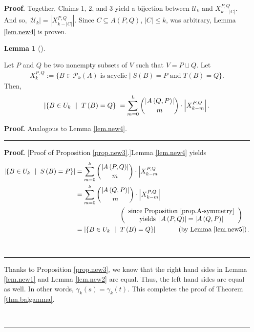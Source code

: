 \documentclass[numbers=enddot,12pt,final,onecolumn,notitlepage]{scrartcl}%
\theoremstyle{definition}
\newtheorem{lem}[theo]{Lemma}
\newenvironment{lemma}[1][]
{\begin{lem}[#1]\begin{leftbar}}
{\end{leftbar}\end{lem}}
\newenvironment{proof}[1][Proof]{\noindent\textbf{#1.} }{\ \rule{0.5em}{0.5em}}
\let\sumnonlimits\sum
\renewcommand{\sum}{\sumnonlimits\limits}
\theoremstyle{plainsl}
\begin{document}
\begin{proof}
\bigskip
Together, Claims 1, 2, and 3 yield a bijection between $\mathcal{U}_{k}$ and $X_{k-|C|}^{P,Q}$. And so, $|\mathcal{U}_{k}| = |X_{k-|C|}^{P,Q}|$. Since $C \subseteq A(P,Q)$, $|C| \leq k$, was arbitrary, Lemma \ref{lem.new4} is proven.

\begin{lemma}
\label{lem.new5}Let $P$ and $Q$ be two nonempty subsets of $V$ such that
$V=P\sqcup Q$. Let \begin{align*}
    X_{k}^{P,Q} := \{B \in \mathcal{P}_{k}(A) \text{ is acyclic} \mid S(B) = P \text{ and } T(B) = Q\}.
\end{align*} Then,%
\[
\left\vert \left\{  B\in U_{k}\ \mid\ T\left(  B\right)  =Q\right\}
\right\vert =\sum_{m=0}^{k}\dbinom{\left\vert A\left(  Q,P\right)  \right\vert
}{m}\cdot\left\vert X_{k-m}^{P,Q}\right\vert .
\]

\end{lemma}

\begin{proof}
Analogous to Lemma \ref{lem.new4}.
\end{proof}

\begin{proof}
[Proof of Proposition \ref{prop.new3}.]Lemma \ref{lem.new4} yields%
\begin{align*}
\left\vert \left\{  B\in U_{k}\ \mid\ S\left(  B\right)  =P\right\}
\right\vert  &  =\sum_{m=0}^{k}\dbinom{\left\vert A\left(  P,Q\right)
\right\vert }{m}\cdot\left\vert X_{k-m}^{P,Q}\right\vert \\
&  =\sum_{m=0}^{k}\dbinom{\left\vert A\left(  Q,P\right)  \right\vert }%
{m}\cdot\left\vert X_{k-m}^{P,Q}\right\vert \\
&  \ \ \ \ \ \ \ \ \ \ \ \ \ \ \ \ \ \ \ \ \left(
\begin{array}
[c]{c}%
\text{since Proposition \ref{prop.A-symmetry}}\\
\text{yields }\left\vert A\left(  P,Q\right)  \right\vert =\left\vert A\left(
Q,P\right)  \right\vert
\end{array}
\right) \\
&  =\left\vert \left\{  B\in U_{k}\ \mid\ T\left(  B\right)  =Q\right\}
\right\vert \ \ \ \ \ \ \ \ \ \ \left(  \text{by Lemma \ref{lem.new5}}\right)
.
\end{align*}

\end{proof}

Thanks to Proposition \ref{prop.new3}, we know that the right hand sides in
Lemma \ref{lem.new1} and Lemma \ref{lem.new2} are equal. Thus, the left hand
sides are equal as well. In other words, $\gamma_{k}\left(  s\right)
=\gamma_{k}\left(  t\right)  $. This completes the proof of Theorem
\ref{thm.balgamma}.


\end{proof}
\end{document}
